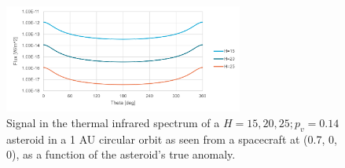 \begin{figure}[htbp]
 \centering
 \includegraphics[width=0.7\textwidth]{img/implementation_tir_signal.pdf}
 \caption{Signal in the thermal infrared spectrum of a $H=15, 20, 25; p_v=0.14$ asteroid in a 1 AU circular orbit as seen from a spacecraft at (0.7, 0, 0), as a function of the asteroid's true anomaly.}
 \label{fig:thermal_signal_implementation}
\end{figure}


